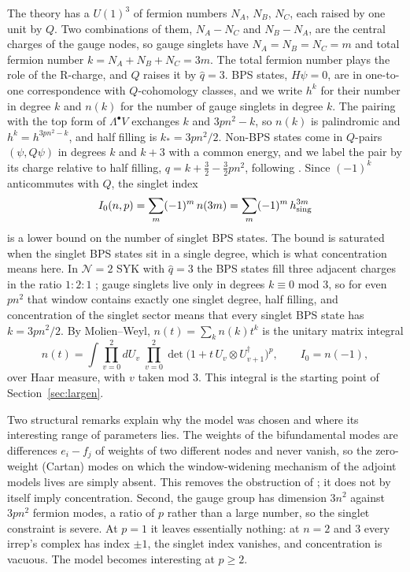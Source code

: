 \documentclass[10pt]{article}
\begin{document}
The theory has a $U(1)^3$ of fermion numbers $N_A$, $N_B$, $N_C$, each raised by one unit by $Q$. Two combinations
of them, $N_A-N_C$ and $N_B-N_A$, are the central charges of the gauge nodes, so gauge singlets have
$N_A=N_B=N_C=m$ and total fermion number $k=N_A+N_B+N_C=3m$. The total fermion number plays the role of the
R-charge, and $Q$ raises it by $\hat q=3$. BPS states, $H\psi=0$, are in one-to-one correspondence with $Q$-cohomology
classes, and we write $h^k$ for their number in degree $k$ and $n(k)$ for the number of gauge singlets in degree
$k$. The pairing with the top form of $\Lambda^\bullet V$ exchanges $k$ and $3pn^2-k$, so $n(k)$ is palindromic and
$h^k=h^{3pn^2-k}$, and half filling is $k_*=3pn^2/2$. Non-BPS states come in $Q$-pairs $(\psi,Q\psi)$ in degrees $k$
and $k+3$ with a common energy, and we label the pair by its charge relative to half filling,
$q=k+\tfrac32-\tfrac32pn^2$, following \cite{TW}. Since $(-1)^k$ anticommutes with $Q$, the singlet index
\begin{equation}
I_0(n,p)=\sum_m(-1)^m\,n(3m)=\sum_m(-1)^m\,h^{3m}_{\rm sing}
\label{eq:index}
\end{equation}
is a lower bound on the number of singlet BPS states. The bound is saturated when the singlet BPS states sit in a
single degree, which is what concentration means here. In $\mathcal N=2$ SYK with $\hat q=3$ the BPS states fill
three adjacent charges in the ratio $1{:}2{:}1$ \cite{FGMS,TW}; gauge singlets live only in degrees $k\equiv0$ mod
3, so for even $pn^2$ that window contains exactly one singlet degree, half filling, and concentration of the
singlet sector means that every singlet BPS state has $k=3pn^2/2$. By Molien--Weyl, $n(t)=\sum_kn(k)t^k$ is the
unitary matrix integral
\begin{equation}
n(t)=\int\prod_{v=0}^2dU_v\;\prod_{v=0}^{2}\det\big(1+t\,U_v\otimes U_{v+1}^\dagger\big)^p,\qquad I_0=n(-1),
\label{eq:MW}
\end{equation}
over Haar measure, with $v$ taken mod 3. This integral is the starting point of Section~\ref{sec:largen}.

Two structural remarks explain why the model was chosen and where its interesting range of parameters lies. The
weights of the bifundamental modes are differences $e_i-f_j$ of weights of two different nodes and never vanish,
so the zero-weight (Cartan) modes on which the window-widening mechanism of the adjoint models lives are simply
absent. This removes the obstruction of \cite{R1,R2}; it does not by itself imply concentration. Second, the gauge
group has dimension $3n^2$ against $3pn^2$ fermion modes, a ratio of $p$ rather than a large number, so the
singlet constraint is severe. At $p=1$ it leaves essentially nothing: at $n=2$ and $3$ every irrep's complex has
index $\pm1$, the singlet index vanishes, and concentration is vacuous. The model becomes interesting at $p\ge2$.
\end{document}
